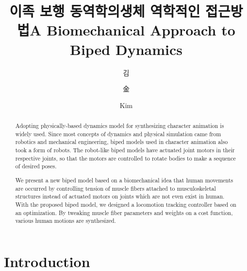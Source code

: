 \documentclass[master,english,final]{kaist-ucs}
\title[korean] {이족 보행 동역학의\linebreak 생체 역학적인 접근방법}
\title[english]{A Biomechanical Approach to Biped Dynamics}
\author[korean] {김}{거 엽}
\author[chinese]{金}{거 엽}
\author[english]{Kim}{Geo Yeob}
\begin{document}

\begin{abstract}
Adopting physically-based dynamics model for synthesizing character animation is widely used.
Since most concepts of dynamics and physical simulation came from robotics and mechanical engineering,
biped models used in character animation also took a form of robots.
The robot-like biped models have actuated joint motors in their respective joints,
so that the motors are controlled to rotate bodies to make a sequence of desired poses.

We present a new biped model based on a biomechanical idea that human movements are occurred
by controlling tension of muscle fibers attached to musculoskeletal structures instead of
actuated motors on joints which are not even exist in human.
With the proposed biped model, we designed a locomotion tracking controller based on an optimization.
By tweaking muscle fiber parameters and weights on a cost function, various human motions are synthesized.

\end{abstract}


\tableofcontents

\listoftables

\listoffigures


\chapter{Introduction}
\end{document}

